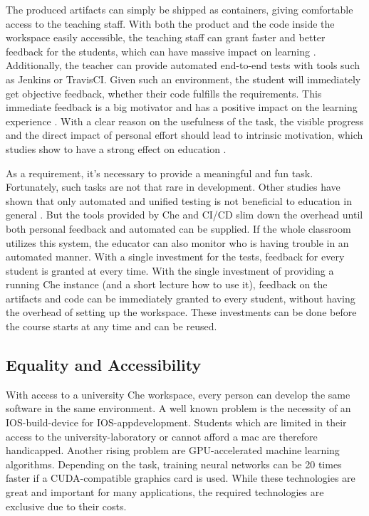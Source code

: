 \documentclass[english,utf8]{lni}
\begin{document}
The produced artifacts can simply be shipped as containers, giving comfortable access to the teaching staff. 
With both the product and the code inside the workspace easily accessible, the teaching staff can grant faster and better feedback for the students, which can have massive impact on learning \cite{HU95}\cite{HU18}.
Additionally, the teacher can provide automated end-to-end tests with tools such as Jenkins or TravisCI. 
Given such an environment, the student will immediately get objective feedback, whether their code fulfills the requirements. 
This immediate feedback is a big motivator and has a positive impact on the learning experience \cite{FI05}. 
With a clear reason on the usefulness of the task, the visible progress and the direct impact of personal effort should lead to intrinsic motivation, which studies show to have a strong effect on education \cite{DECI93}. 

As a requirement, it's necessary to provide a meaningful and fun task. 
Fortunately, such tasks are not that rare in development.  
Other studies have shown that only automated and unified testing is not beneficial to education in general \cite{TC88}. 
But the tools provided by Che and CI/CD slim down the overhead until both personal feedback and automated can be supplied. 
If the whole classroom utilizes this system, the educator can also monitor who is having trouble in an automated manner. 
With a single investment for the tests, feedback for every student is granted at every time. 
With the single investment of providing a running Che instance (and a short lecture how to use it), feedback on the artifacts and code can be immediately granted to every student, without having the overhead of setting up the workspace. 
These investments can be done before the course starts at any time and can be reused.
\subsection{Equality and Accessibility}
With access to a university Che workspace, every person can develop the same software in the same environment. 
A well known problem is the necessity of an IOS-build-device for IOS-appdevelopment.
Students which are limited in their access to the university-laboratory or cannot afford a mac are therefore handicapped.
Another  rising  problem  are  GPU-accelerated  machine learning algorithms. 
Depending on the task, training neural networks can be 20 times faster if a CUDA-compatible graphics card is used.
While these technologies are great and important for many applications, the required technologies are exclusive due to  their  costs.
\end{document}
